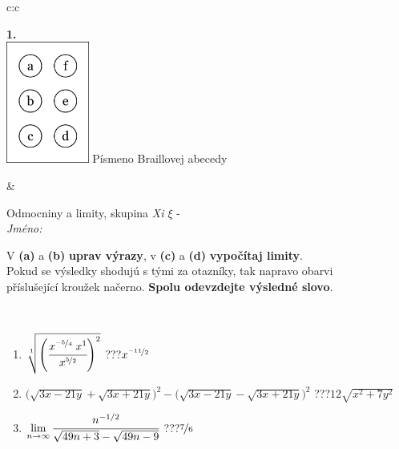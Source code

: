 \documentclass[10pt]{report}
\begin{document}
\begin{tabular}{c:c}
\begin{minipage}[c][104.5mm][t]{0.5\linewidth}
\begin{center}
\begin{minipage}{0.20\linewidth}
\begin{center}
{\Huge\bfseries 1.} \\[2mm]
\includegraphics[height=40mm]{../images/braille.png}
{\small Písmeno Braillovej abecedy}
\end{center}
\end{minipage}
\end{center}
\end{minipage}
&
\begin{minipage}[c][104.5mm][t]{0.5\linewidth}
\begin{center}
\vspace{7mm}
{\huge Odmocniny a limity, skupina \textit{Xi $\xi$} -}\\[5mm]
\textit{Jméno:}\phantom{xxxxxxxxxxxxxxxxxxxxxxxxxxxxxxxxxxxxxxxxxxxxxxxxxxxxxxxxxxxxxxxxx}\\[5mm]
\begin{minipage}{0.95\linewidth}
\begin{center}
V \textbf{(a)} a \textbf{(b)} \textbf{uprav výrazy}, v \textbf{(c)} a \textbf{(d)} \textbf{vypočítaj limity}.\\Pokud se výsledky shodujú s tými za otazníky, tak napravo obarvi\\příslušející kroužek načerno. \textbf{Spolu odevzdejte výsledné slovo}.
\end{center}
\end{minipage}
\\[1mm]
\begin{minipage}{0.79\linewidth}
\begin{center}
\begin{varwidth}{\linewidth}
\begin{enumerate}
\small
\item $\sqrt[1]{\left(\cfrac{x^{\nicefrac{-5}{4}}\;x^{1}}{x^{\nicefrac{5}{2}}}\right)^{2}}$\quad \dotfill\; ???\;\dotfill \quad $x^{\nicefrac{-11}{2}}$
\item {\footnotesize{\scriptsize$\big(\sqrt{3x-21y}+\sqrt{3x+21y}\big)^2-\big(\sqrt{3x-21y}-\sqrt{3x+21y}\big)^2$}\quad \dotfill\; ???\;\dotfill \quad $12\sqrt{x^2+7y^2}$}
\item $\lim\limits_{n\to\infty}\cfrac{n^{-1/2}}{\sqrt{49n+3}-\sqrt{49n-9}}$\quad \dotfill\; ???\;\dotfill \quad $\nicefrac{7}{6}$

\end{enumerate}
\end{varwidth}
\end{center}
\end{minipage}
\end{center}
\end{minipage}
\end{tabular}
\end{document}
